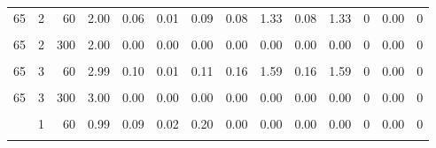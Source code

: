 \begin{table}
\begin{tabular}{rrrrrrrrrrrrrr}
65 & 2 & 60 & 2.00 & 0.06 & 0.01 & 0.09 & 0.08 & 1.33 & 0.08 & 1.33 & 0 & 0.00 & 0\\
\cellcolor{gray!6}{65} & \cellcolor{gray!6}{2} & \cellcolor{gray!6}{120} & \cellcolor{gray!6}{2.00} & \cellcolor{gray!6}{0.00} & \cellcolor{gray!6}{0.00} & \cellcolor{gray!6}{0.00} & \cellcolor{gray!6}{0.00} & \cellcolor{gray!6}{0.00} & \cellcolor{gray!6}{0.00} & \cellcolor{gray!6}{0.00} & \cellcolor{gray!6}{0} & \cellcolor{gray!6}{0.00} & \cellcolor{gray!6}{0}\\
65 & 2 & 300 & 2.00 & 0.00 & 0.00 & 0.00 & 0.00 & 0.00 & 0.00 & 0.00 & 0 & 0.00 & 0\\
\addlinespace
\cellcolor{gray!6}{65} & \cellcolor{gray!6}{3} & \cellcolor{gray!6}{30} & \cellcolor{gray!6}{2.22} & \cellcolor{gray!6}{0.75} & \cellcolor{gray!6}{0.81} & \cellcolor{gray!6}{0.71} & \cellcolor{gray!6}{12.89} & \cellcolor{gray!6}{13.44} & \cellcolor{gray!6}{10.80} & \cellcolor{gray!6}{9.64} & \cellcolor{gray!6}{0} & \cellcolor{gray!6}{0.03} & \cellcolor{gray!6}{0}\\
65 & 3 & 60 & 2.99 & 0.10 & 0.01 & 0.11 & 0.16 & 1.59 & 0.16 & 1.59 & 0 & 0.00 & 0\\
\cellcolor{gray!6}{65} & \cellcolor{gray!6}{3} & \cellcolor{gray!6}{120} & \cellcolor{gray!6}{3.00} & \cellcolor{gray!6}{0.00} & \cellcolor{gray!6}{0.00} & \cellcolor{gray!6}{0.00} & \cellcolor{gray!6}{0.00} & \cellcolor{gray!6}{0.00} & \cellcolor{gray!6}{0.00} & \cellcolor{gray!6}{0.00} & \cellcolor{gray!6}{0} & \cellcolor{gray!6}{0.00} & \cellcolor{gray!6}{0}\\
65 & 3 & 300 & 3.00 & 0.00 & 0.00 & 0.00 & 0.00 & 0.00 & 0.00 & 0.00 & 0 & 0.00 & 0\\
\cellcolor{gray!6}{129} & \cellcolor{gray!6}{1} & \cellcolor{gray!6}{30} & \cellcolor{gray!6}{0.63} & \cellcolor{gray!6}{0.48} & \cellcolor{gray!6}{0.83} & \cellcolor{gray!6}{1.09} & \cellcolor{gray!6}{0.00} & \cellcolor{gray!6}{0.00} & \cellcolor{gray!6}{0.00} & \cellcolor{gray!6}{0.00} & \cellcolor{gray!6}{0} & \cellcolor{gray!6}{0.04} & \cellcolor{gray!6}{0}\\
\addlinespace
129 & 1 & 60 & 0.99 & 0.09 & 0.02 & 0.20 & 0.00 & 0.00 & 0.00 & 0.00 & 0 & 0.00 & 0\\
\cellcolor{gray!6}{129} & \cellcolor{gray!6}{1} & \cellcolor{gray!6}{120} & \cellcolor{gray!6}{1.00} & \cellcolor{gray!6}{0.00} & \cellcolor{gray!6}{0.00} & \cellcolor{gray!6}{0.00} & \cellcolor{gray!6}{0.00} & \cellcolor{gray!6}{0.00} & \cellcolor{gray!6}{0.00} & \cellcolor{gray!6}{0.00} & \cellcolor{gray!6}{0} & \cellcolor{gray!6}{0.00} & \cellcolor{gray!6}{0}\\

\end{tabular}
\end{table}

